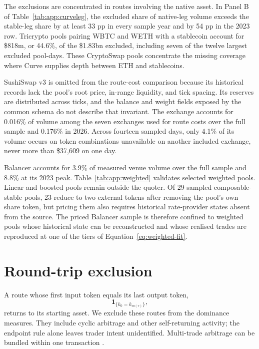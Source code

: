 The exclusions are concentrated in routes involving the native asset. In Panel B of Table~\ref{tab:app:curveleg}, the excluded share of native-leg volume exceeds the stable-leg share by at least 33 pp in every sample year and by 54 pp in the 2023 row. Tricrypto pools pairing WBTC and WETH with a stablecoin account for \$818m, or 44.6\%, of the \$1.83bn excluded, including seven of the twelve largest excluded pool-days. These CryptoSwap pools concentrate the missing coverage where Curve supplies depth between ETH and stablecoins.

SushiSwap v3 is omitted from the route-cost comparison because its historical records lack the pool's root price, in-range liquidity, and tick spacing. Its reserves are distributed across ticks, and the balance and weight fields exposed by the common schema do not describe that invariant. The exchange accounts for 0.016\% of volume among the seven exchanges used for route costs over the full sample and 0.176\% in 2026. Across fourteen sampled days, only 4.1\% of its volume occurs on token combinations unavailable on another included exchange, never more than \$37,609 on one day.

Balancer accounts for 3.9\% of measured venue volume over the full sample and 8.8\% at its 2023 peak. Table~\ref{tab:app:weighted} validates selected weighted pools. Linear and boosted pools remain outside the quoter. Of 29 sampled composable-stable pools, 23 reduce to two external tokens after removing the pool's own share token, but pricing them also requires historical rate-provider states absent from the source. The priced Balancer sample is therefore confined to weighted pools whose historical state can be reconstructed and whose realised trades are reproduced at one of the tiers of Equation~\eqref{eq:weighted-fit}.

\section{Round-trip exclusion}
\label{app:roundtrip}

A route whose first input token equals its last output token,
\[
\mathbf{1}_{\{k_0 = k_{m(r)}\}},
\]
returns to its starting asset. We exclude these routes from the dominance measures. They include cyclic arbitrage and other self-returning activity; the endpoint rule alone leaves trader intent unidentified. Multi-trade arbitrage can be bundled within one transaction \citep{DaianEtAl2020FlashBoys}.

